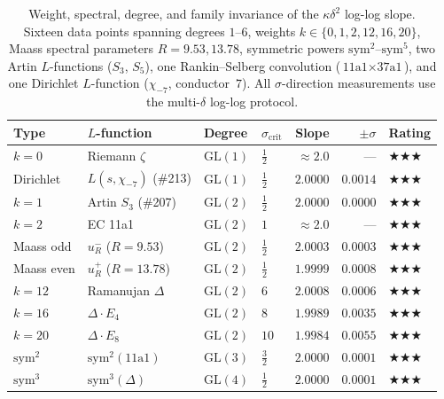 \documentclass[11pt, a4paper]{article}
\theoremstyle{plain}
\theoremstyle{definition}
\begin{document}
\begin{table}[ht]
\centering
\caption{Weight, spectral, degree, and family invariance of the $\kappa\delta^{2}$
  log-log slope.  Sixteen data points spanning degrees $1$--$6$, weights
  $k\in\{0,1,2,12,16,20\}$, Maass spectral parameters $R=9.53,13.78$,
  symmetric powers $\mathrm{sym}^{2}$--$\mathrm{sym}^{5}$,
  two Artin $L$-functions ($S_3$, $S_5$), one Rankin--Selberg
  convolution ($\text{11a1}\times\text{37a1}$), and one Dirichlet
  $L$-function ($\chi_{-7}$, conductor~$7$).
  All $\sigma$-direction measurements use the multi-$\delta$ log-log protocol.}
\label{tab:weightuniv}
\small
\begin{tabular}{llllrrl}
\toprule
Type & $L$-function & Degree & $\sigma_{\mathrm{crit}}$ & Slope & $\pm\sigma$ & Rating \\
\midrule
$k{=}0$  & Riemann $\zeta$ & $\mathrm{GL}(1)$ & $\tfrac{1}{2}$ & $\approx 2.0$ & --- & $\bigstar\bigstar\bigstar$ \\
Dirichlet & $L(s,\chi_{-7})$ (\#213) & $\mathrm{GL}(1)$ & $\tfrac{1}{2}$ & $\mathbf{2.0000}$ & $\mathbf{0.0014}$ & $\bigstar\bigstar\bigstar$ \\
$k{=}1$  & Artin $S_3$ (\#207) & $\mathrm{GL}(2)$ & $\tfrac{1}{2}$ & $\mathbf{2.0000}$ & $\mathbf{0.0000}$ & $\bigstar\bigstar\bigstar$ \\
$k{=}2$  & EC 11a1 & $\mathrm{GL}(2)$ & $1$ & $\approx 2.0$ & --- & $\bigstar\bigstar\bigstar$ \\
Maass odd & $u_{R}^{-}$ ($R{=}9.53$) & $\mathrm{GL}(2)$ & $\tfrac{1}{2}$ & $\mathbf{2.0003}$ & $\mathbf{0.0003}$ & $\bigstar\bigstar\bigstar$ \\
Maass even & $u_{R}^{+}$ ($R{=}13.78$) & $\mathrm{GL}(2)$ & $\tfrac{1}{2}$ & $1.9999$ & $0.0008$ & $\bigstar\bigstar\bigstar$ \\
$k{=}12$ & Ramanujan $\Delta$ & $\mathrm{GL}(2)$ & $6$ & $2.0008$ & $0.0006$ & $\bigstar\bigstar\bigstar$ \\
$k{=}16$ & $\Delta\cdot E_4$ & $\mathrm{GL}(2)$ & $8$ & $1.9989$ & $0.0035$ & $\bigstar\bigstar\bigstar$ \\
$k{=}20$ & $\Delta\cdot E_8$ & $\mathrm{GL}(2)$ & $10$ & $1.9984$ & $0.0055$ & $\bigstar\bigstar\bigstar$ \\
$\mathrm{sym}^{2}$ & $\mathrm{sym}^{2}(\text{11a1})$ & $\mathrm{GL}(3)$ & $\tfrac{3}{2}$ & $\mathbf{2.0000}$ & $\mathbf{0.0001}$ & $\bigstar\bigstar\bigstar$ \\
$\mathrm{sym}^{3}$ & $\mathrm{sym}^{3}(\Delta)$ & $\mathrm{GL}(4)$ & $\tfrac{1}{2}$ & $\mathbf{2.0000}$ & $\mathbf{0.0001}$ & $\bigstar\bigstar\bigstar$ \\

\end{tabular}
\end{table}
\end{document}

